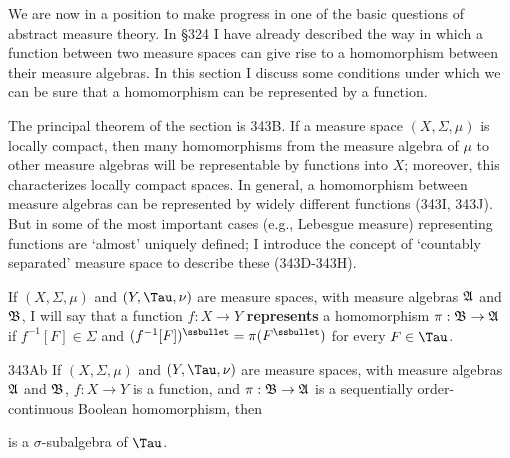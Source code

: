 
\def\chaptername{The lifting theorem}
\def\sectionname{Realization of homomorphisms}


We are now in a position to make progress in one of the basic questions
of abstract measure theory.   In \S324 I have already described the
way in which a function between two measure spaces can give rise to a
homomorphism between their measure algebras.   In this section I discuss
some conditions under which we can be sure that a
homomorphism can be represented by a function.

The principal theorem of the section is 343B.  If a measure space
$(X,\Sigma,\mu)$ is locally compact, then many homomorphisms from the
measure algebra of $\mu$ to other measure algebras will be representable
by functions into $X$;  moreover, this characterizes locally compact
spaces.   In general, a homomorphism between measure
algebras can be represented by widely different functions (343I,
343J).  But in some of the most important cases (e.g., Lebesgue
measure) representing functions are `almost' uniquely defined;  I
introduce the concept of `countably separated' measure space to describe these (343D-343H).

  If $(X,\Sigma,\mu)$ and $(Y,\Tau,\nu)$ are
measure spaces, with measure algebras $\frak A$ and $\frak B$, I will
say that a function $f:X\to Y$ {\bf represents} a homomorphism
$\pi:\frak B\to\frak A$ if $f^{-1}[F]\in\Sigma$ and
$(f^{-1}[F])^{\ssbullet}=\pi(F^{\ssbullet})$ for every $F\in\Tau$.


\spheader 343Ab If $(X,\Sigma,\mu)$ and $(Y,\Tau,\nu)$ are
measure spaces, with measure algebras $\frak A$ and $\frak B$,
$f:X\to Y$ is a function, and $\pi:\frak B\to\frak A$ is a
sequentially order-continuous Boolean homomorphism, then


\noindent is a $\sigma$-subalgebra of $\Tau$.   

